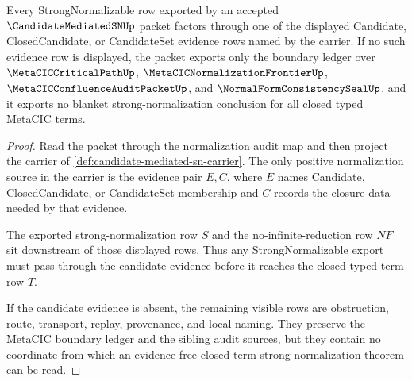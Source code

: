\begin{theorem}
\label{thm:candidate-mediated-sn-no-hidden-oracle}
Every StrongNormalizable row exported by an accepted $\CandidateMediatedSNUp$ packet factors through one of the displayed Candidate, ClosedCandidate, or CandidateSet evidence rows named by the carrier. If no such evidence row is displayed, the packet exports only the boundary ledger over $\MetaCICCriticalPathUp$, $\MetaCICNormalizationFrontierUp$, $\MetaCICConfluenceAuditPacketUp$, and $\NormalFormConsistencySealUp$, and it exports no blanket strong-normalization conclusion for all closed typed MetaCIC terms.
\end{theorem}
\begin{proof}
Read the packet through the normalization audit map and then project the carrier of \autoref{def:candidate-mediated-sn-carrier}. The only positive normalization source in the carrier is the evidence pair $E,C$, where $E$ names Candidate, ClosedCandidate, or CandidateSet membership and $C$ records the closure data needed by that evidence.

The exported strong-normalization row $S$ and the no-infinite-reduction row $NF$ sit downstream of those displayed rows. Thus any StrongNormalizable export must pass through the candidate evidence before it reaches the closed typed term row $T$.

If the candidate evidence is absent, the remaining visible rows are obstruction, route, transport, replay, provenance, and local naming. They preserve the MetaCIC boundary ledger and the sibling audit sources, but they contain no coordinate from which an evidence-free closed-term strong-normalization theorem can be read.
\end{proof}

